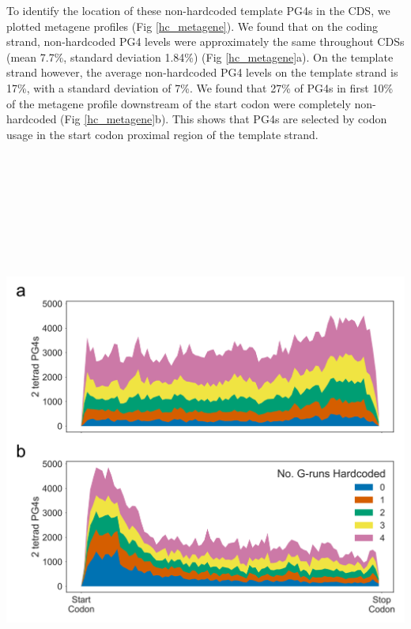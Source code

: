 \documentclass[12pt,a4paper,]{report}
\let\origfigure=\figure
\let\endorigfigure=\endfigure
\renewenvironment{figure}[1][2] {
    \expandafter\origfigure\expandafter[H]
} {
    \endorigfigure
}
\begin{document}
\newpage

To identify the location of these non-hardcoded template PG4s in the
CDS, we plotted metagene profiles (Fig \ref{hc_metagene}). We found that
on the coding strand, non-hardcoded PG4 levels were approximately the
same throughout CDSs (mean 7.7\%, standard deviation 1.84\%) (Fig
\ref{hc_metagene}a). On the template strand however, the average
non-hardcoded PG4 levels on the template strand is 17\%, with a standard
deviation of 7\%. We found that 27\% of PG4s in first 10\% of the
metagene profile downstream of the start codon were completely
non-hardcoded (Fig \ref{hc_metagene}b). This shows that PG4s are
selected by codon usage in the start codon proximal region of the
template strand.

\newpage

\begin{figure}[htbp]
\centering
\includegraphics[width=\textwidth,height=562pt,keepaspectratio]{chapter_4/figures/cds_hardcoded_metagene.png}
\caption[Non-hardcoded PG4s levels are greater at the start codon proximal region of CDSs, on the template strand.]{\textbf{Non-hardcoded   PG4s   levels   are   greater   at   the   start   codon   proximal   region   of   CDSs,   on   the   template   strand.}   \textbf{a)}   Cumulative   metagene   profiles   showing   the   distribution   of   PG4s   with   different   numbers   of   hardcoded   G-runs   on   the   \textbf{a)}   coding   and   \textbf{b)}   template   strands,   respectively.   \label{hc_metagene}}
\end{figure}
\end{document}
